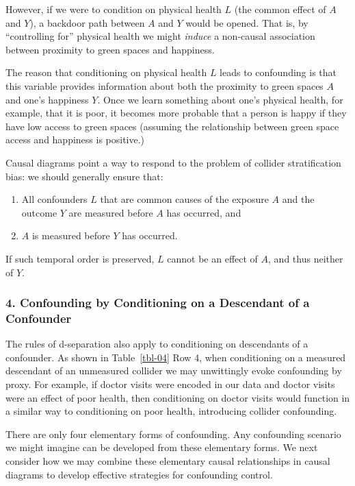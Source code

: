 \documentclass[
  singlecolumn]{article}
\begin{document}
However, if we were to condition on physical health \(L\) (the common
effect of \(A\) and \(Y\)), a backdoor path between \(A\) and \(Y\)
would be opened. That is, by ``controlling for'' physical health we
might \emph{induce} a non-causal association between proximity to green
spaces and happiness.

The reason that conditioning on physical health \(L\) leads to
confounding is that this variable provides information about both the
proximity to green spaces \(A\) and one's happiness \(Y\). Once we learn
something about one's physical health, for example, that it is poor, it
becomes more probable that a person is happy if they have low access to
green spaces (assuming the relationship between green space access and
happiness is positive.)

Causal diagrams point a way to respond to the problem of collider
stratification bias: we should generally ensure that:

\begin{enumerate}
\def\labelenumi{\arabic{enumi}.}
\item
  All confounders \(L\) that are common causes of the exposure \(A\) and
  the outcome \(Y\) are measured before \(A\) has occurred, and
\item
  \(A\) is measured before \(Y\) has occurred.
\end{enumerate}

If such temporal order is preserved, \(L\) cannot be an effect of \(A\),
and thus neither of \(Y\).

\subsubsection{4. Confounding by Conditioning on a Descendant of a
Confounder}\label{confounding-by-conditioning-on-a-descendant-of-a-confounder}

The rules of d-separation also apply to conditioning on descendants of a
confounder. As shown in Table~\ref{tbl-04} Row 4, when conditioning on a
measured descendant of an unmeasured collider we may unwittingly evoke
confounding by proxy. For example, if doctor visits were encoded in our
data and doctor visits were an effect of poor health, then conditioning
on doctor visits would function in a similar way to conditioning on poor
health, introducing collider confounding.

There are only four elementary forms of confounding. Any confounding
scenario we might imagine can be developed from these elementary forms.
We next consider how we may combine these elementary causal
relationships in causal diagrams to develop effective strategies for
confounding control.
\end{document}
